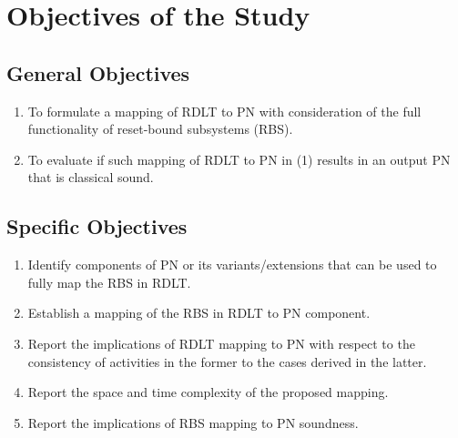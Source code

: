 \section{Objectives of the Study}
    \subsection{General Objectives}
    \begin{enumerate}
        \item To formulate a mapping of RDLT to PN with consideration of the full functionality of reset-bound subsystems (RBS).
        \item To evaluate if such mapping of RDLT to PN in (1) results in an output PN that is classical sound.
    \end{enumerate}

    \subsection{Specific Objectives}
    \begin{enumerate}
        \item Identify components of PN or its variants/extensions that can be used to fully map the RBS in RDLT.
        \item Establish a mapping of the RBS in RDLT to PN component.
        \item Report the implications of RDLT mapping to PN with respect to the consistency of activities in the former to the cases derived in the latter.
        \item Report the space and time complexity of the proposed mapping.
        \item Report the implications of RBS mapping to PN soundness.
    \end{enumerate}